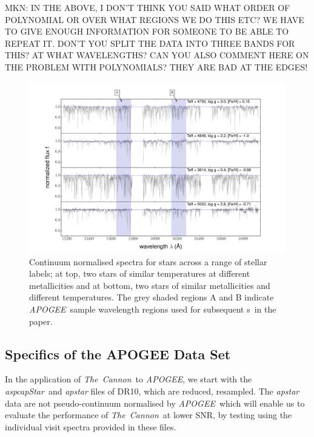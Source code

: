\documentclass[12pt, preprint]{aastex}
\newcommand{\figurenames}{\figurename s}
\newcommand{\tc}{\textsl{The~Cannon}}
\newcommand{\apogee}{\textsl{APOGEE}}
\newcommand{\aspcapstar}{\textsl{aspcapStar}}
\begin{document}
MKN:  IN THE ABOVE, I DON'T THINK YOU SAID WHAT ORDER OF POLYNOMIAL OR OVER WHAT REGIONS WE DO THIS ETC?
WE HAVE TO GIVE ENOUGH INFORMATION FOR SOMEONE TO BE ABLE TO REPEAT IT.
DON'T YOU SPLIT THE DATA INTO THREE BANDS FOR THIS?  AT WHAT WAVELENGTHS?
CAN YOU ALSO COMMENT HERE ON THE PROBLEM WITH POLYNOMIALS?  THEY ARE BAD AT THE EDGES!


\begin{figure}[h!]
  \includegraphics[width=\hsize]{./plots/four_examples3.pdf}
\caption{Continuum normalised spectra for stars across a range of stellar labels; at top, two stars of similar temperatures at different metallicities and at bottom, two stars of similar metallicities and different temperatures. The grey shaded regions A and B indicate \apogee\ sample wavelength regions used for subsequent \figurenames\ in the paper.}
\label{fig:norm}
\end{figure}

\subsection{Specifics of the APOGEE Data Set}
\label{sec:Apogee_as_worked_Example}

In the application of \tc\ to  \apogee, we start with the \aspcapstar\ and \textit{apstar} files of DR10,
which are reduced,  resampled. 
The \textit{apstar}  data are not pseudo-continuum normalised by \apogee\,
which will enable us to evaluate the performance of \tc\ at lower SNR, by testing using the individual visit spectra provided in these files. 
\end{document}
